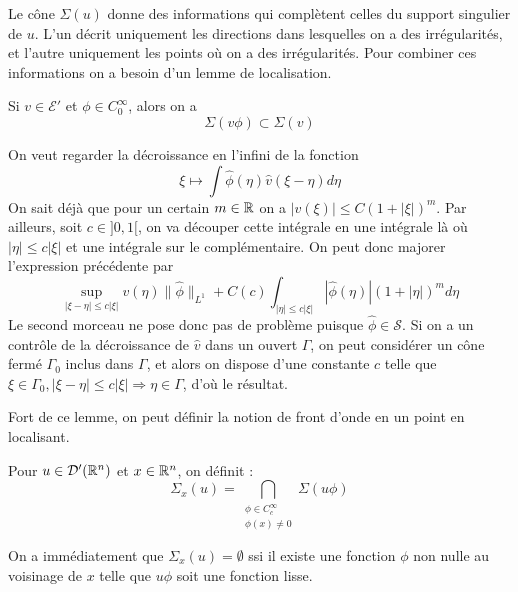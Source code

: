 Le cône $\Sigma(u)$ donne des informations qui complètent celles du support singulier de $u$. L'un décrit uniquement les directions dans lesquelles on a des irrégularités, et l'autre uniquement les points où on a des irrégularités. Pour combiner ces informations on a besoin d'un lemme de localisation.

\begin{lem}
	Si $v \in \mathcal{E}'$ et $\phi \in C^{\infty}_0$, alors on a 
	\begin{equation*}
		\Sigma(v\phi) \subset \Sigma(v)
	\end{equation*}
\end{lem}
\begin{preuve}
	On veut regarder la décroissance en l'infini de la fonction
	\begin{equation*}
		\xi \mapsto \int \hat{\phi}(\eta)\hat{v}(\xi-\eta)d\eta
	\end{equation*}
	On sait déjà que pour un certain $m\in \mathbb{R}$ on a $|v(\xi)|\leq C(1+|\xi|)^m$. Par ailleurs, soit $c\in ]0,1[$, on va découper cette intégrale en une intégrale là où $|\eta| \leq c|\xi|$ et une intégrale sur le complémentaire. On peut donc majorer l'expression précédente par
	\begin{equation*}
		\underset{|\xi-\eta| \leq c|\xi|}{\sup}v(\eta) \|\hat{\phi}\|_{L^1} + C(c)\int_{|\eta|\leq c|\xi|}|\hat{\phi}(\eta)|(1+|\eta|)^md\eta
	\end{equation*}
	Le second morceau ne pose donc pas de problème puisque $\hat{\phi}\in \mathcal{S}$. Si on a un contrôle de la décroissance de $\hat{v}$ dans un ouvert $\Gamma$, on peut considérer un cône fermé $\Gamma_0$ inclus dans $\Gamma$, et alors on dispose d'une constante $c$ telle que $\xi \in \Gamma_0,|\xi-\eta|\leq c |\xi| \Rightarrow \eta \in \Gamma$, d'où le résultat.
\end{preuve}

Fort de ce lemme, on peut définir la notion de front d'onde en un point en localisant.
\begin{defn}
	Pour $u \in \mathcal{D'}(\mathbb{R}^n)$ et $x\in \mathbb{R}^n$, on définit :
	\begin{equation*}
		\Sigma_x(u)=\bigcap_{\substack{\phi \in C^{\infty}_c\\\phi(x)\neq 0}}\Sigma(u\phi)
	\end{equation*}
\end{defn}
On a immédiatement que $\Sigma_x(u)=\emptyset$ ssi il existe une fonction $\phi$ non nulle au voisinage de $x$ telle que $u\phi$ soit une fonction lisse.

